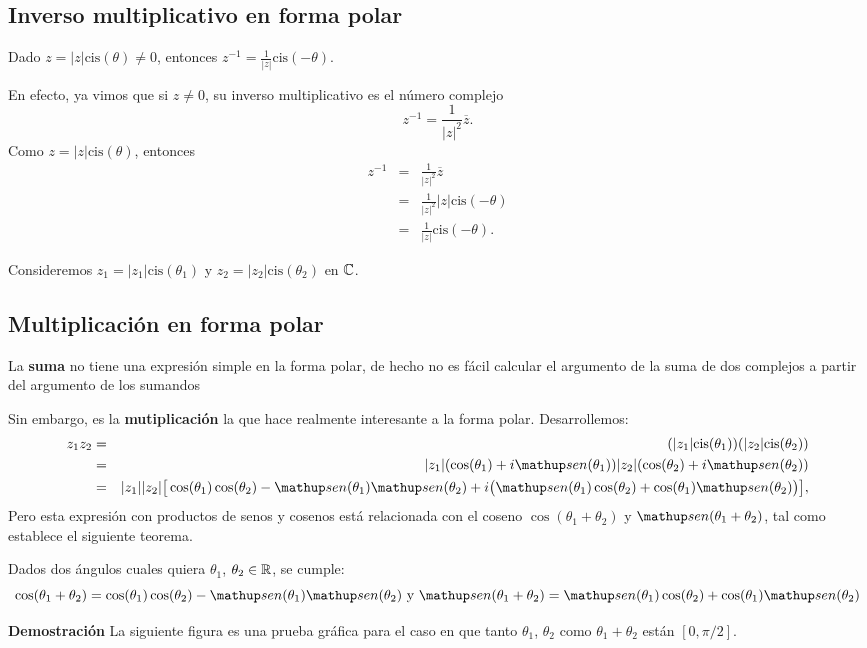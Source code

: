 \subsection{Inverso multiplicativo en forma polar}
Dado $z = |z| \mbox{cis}(\theta)\not=0$, entonces $z^{-1} = \frac{1}{|z|} \mbox{cis}(-\theta)$.

En efecto, ya vimos que si $z \ne 0$, su inverso multiplicativo es el n\'umero complejo
$$z^{-1} = \frac{1}{|z|^2}\overline{z}.$$
Como $z = |z| \mbox{cis}(\theta)$, entonces
\begin{eqnarray*}
    z^{-1} &=& \frac{1}{|z|^2} \overline{z}\\
        &=& \frac{1}{|z|^2}  |z| \mbox{cis}(- \theta)\\
        & =& \frac{1}{|z|} \mbox{cis}(- \theta).
\end{eqnarray*}




Consideremos $z_1 = |z_1| \mbox{cis}(\theta_1)$ y $z_2 = |z_2| \mbox{cis}(\theta_2)$ en $\mathbb{C}$.

\subsection{Multiplicación en forma polar}

La {\bf suma} no tiene una expresión simple en la forma polar, de hecho no es fácil calcular el argumento de la suma de dos complejos a partir del argumento de los sumandos

Sin embargo, es la {\bf mutiplicación} la que hace realmente interesante a la forma polar.
Desarrollemos:
\begin{eqnarray*}
    z_1 z_2 &=& (|z_1| \mbox{cis}(\theta_1))(|z_2| \mbox{cis}(\theta_2))\\
    &=& |z_1| (\cos(\theta_1)+i \sen(\theta_1))|z_2| (\cos(\theta_2)+i \sen(\theta_2))\\
    &=& |z_1| |z_2| \big[\cos(\theta_1) \cos(\theta_2)-\sen(\theta_1) \sen(\theta_2)
    + i \big(\sen(\theta_1) \cos(\theta_2) + \cos(\theta_1) \sen(\theta_2)\big)\big],\\
\end{eqnarray*}
Pero esta expresión con productos de senos y cosenos está relacionada con el coseno $\cos(\theta_1+\theta_2)$ y $\sen(\theta_1+\theta_2)$, tal como establece el siguiente teorema.

\medskip

\begin{thm}
Dados dos ángulos cuales quiera $\theta_1$, $\theta_2\in\mathbb{R}$, se cumple:
$$\cos(\theta_1+\theta_2)=\cos(\theta_1) \cos(\theta_2)-\sen(\theta_1) \sen(\theta_2)\textrm{ y }\sen(\theta_1+\theta_2)=\sen(\theta_1) \cos(\theta_2) + \cos(\theta_1) \sen(\theta_2)$$
\end{thm}
{\bf Demostración} La siguiente figura es una prueba gráfica para el caso en que tanto $\theta_1$, $\theta_2$ como $\theta_1+\theta_2$ están $[0,\pi/2]$.

